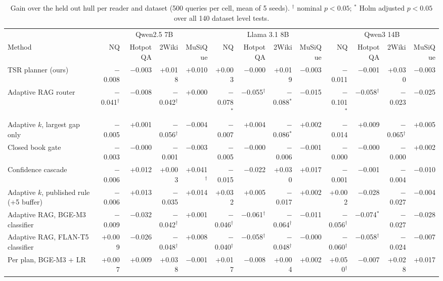 \begin{table}[t]
\centering
\caption{Gain over the held out hull per reader and dataset (500 queries per cell, mean of 5 seeds). $^\dagger$ nominal $p<0.05$; $^{*}$ Holm adjusted $p<0.05$ over all 140 dataset level tests.}
\label{tab:per_dataset}
\scriptsize
\setlength{\tabcolsep}{3pt}
\begin{tabular}{lrrrrrrrrrrrr}
\toprule
 & \multicolumn{4}{c}{Qwen2.5 7B} & \multicolumn{4}{c}{Llama 3.1 8B} & \multicolumn{4}{c}{Qwen3 14B} \\
\cmidrule(lr){2-5} \cmidrule(lr){6-9} \cmidrule(lr){10-13}
Method & NQ & HotpotQA & 2Wiki & MuSiQue & NQ & HotpotQA & 2Wiki & MuSiQue & NQ & HotpotQA & 2Wiki & MuSiQue \\
\midrule
TSR planner (ours) & $-$0.008 & $-$0.003 & +0.018 & +0.010 & +0.003 & $-$0.000 & +0.019 & $-$0.003 & $-$0.011 & $-$0.001 & +0.030 & $-$0.003 \\
Adaptive RAG router & $-$0.041$^\dagger$ & $-$0.008 & $-$0.042$^\dagger$ & +0.000 & $-$0.078$^{*}$ & $-$0.055$^\dagger$ & $-$0.088$^{*}$ & $-$0.015 & $-$0.101$^{*}$ & $-$0.058$^\dagger$ & $-$0.023 & $-$0.025 \\
Adaptive $k$, largest gap only & $-$0.005 & +0.001 & $-$0.056$^\dagger$ & $-$0.004 & $-$0.007 & +0.004 & $-$0.086$^{*}$ & +0.002 & $-$0.014 & +0.009 & $-$0.065$^\dagger$ & +0.005 \\
Closed book gate & $-$0.003 & $-$0.000 & $-$0.001 & $-$0.003 & $-$0.005 & $-$0.000 & $-$0.006 & $-$0.001 & $-$0.000 & $-$0.000 & $-$0.000 & +0.002 \\
Confidence cascade & $-$0.006 & +0.012 & +0.003 & +0.041$^\dagger$ & $-$0.015 & $-$0.022 & +0.030 & +0.017 & $-$0.001 & $-$0.001 & $-$0.004 & $-$0.010 \\
Adaptive $k$, published rule (+5 buffer) & $-$0.006 & +0.013 & $-$0.035 & +0.014 & +0.032 & +0.005 & $-$0.017 & +0.002 & +0.002 & $-$0.028 & $-$0.027 & $-$0.004 \\
Adaptive RAG, BGE-M3 classifier & $-$0.009 & $-$0.032 & $-$0.042$^\dagger$ & +0.001 & $-$0.046$^\dagger$ & $-$0.061$^\dagger$ & $-$0.064$^\dagger$ & $-$0.011 & $-$0.056$^\dagger$ & $-$0.074$^{*}$ & $-$0.027 & $-$0.028 \\
Adaptive RAG, FLAN-T5 classifier & +0.009 & $-$0.026 & $-$0.048$^\dagger$ & +0.008 & $-$0.040$^\dagger$ & $-$0.058$^\dagger$ & $-$0.048$^\dagger$ & $-$0.000 & $-$0.060$^\dagger$ & $-$0.058$^\dagger$ & $-$0.024 & $-$0.007 \\
Per plan, BGE-M3 + LR & +0.007 & +0.009 & +0.038 & $-$0.001 & +0.017 & $-$0.008 & +0.004 & +0.002 & +0.050$^\dagger$ & $-$0.007 & +0.028 & +0.017 \\

\end{tabular}
\end{table}
